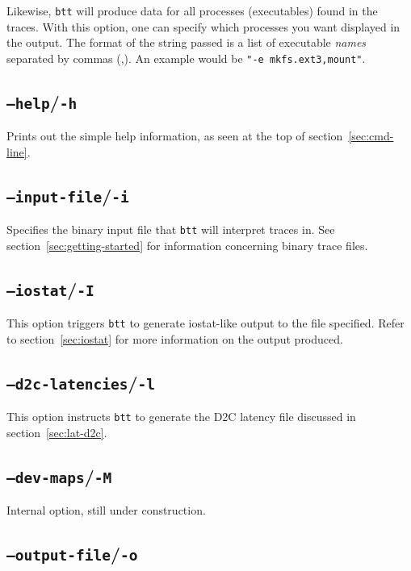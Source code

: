 \documentclass{article}
\begin{document}
  Likewise, \texttt{btt} will produce data for all processes (executables)
  found in the traces. With this option, one can specify which processes
  you want displayed in the output. The format of the string passed is
  a list of executable \emph{names} separated by commas (,). An example
  would be \texttt{"-e mkfs.ext3,mount"}.

\subsection{\label{sec:o-h}\texttt{--help}/\texttt{-h}}

  Prints out the simple help information, as seen at the top of
  section~\ref{sec:cmd-line}.

\subsection{\label{sec:o-i}\texttt{--input-file}/\texttt{-i}}

  Specifies the binary input file that \texttt{btt} will interpret traces
  in. See section~\ref{sec:getting-started} for information concerning
  binary trace files.

\subsection{\label{sec:o-I}\texttt{--iostat}/\texttt{-I}}

  This option triggers \texttt{btt} to generate iostat-like output to the
  file specified. Refer to section~\ref{sec:iostat} for more information
  on the output produced.

\subsection{\label{sec:o-l}\texttt{--d2c-latencies}/\texttt{-l}}

  This option instructs \texttt{btt} to generate the D2C latency file
  discussed in section~\ref{sec:lat-d2c}.

\subsection{\label{sec:o-M}\texttt{--dev-maps}/\texttt{-M}}

  Internal option, still under construction.

\subsection{\label{sec:o-o}\texttt{--output-file}/\texttt{-o}}
\end{document}
